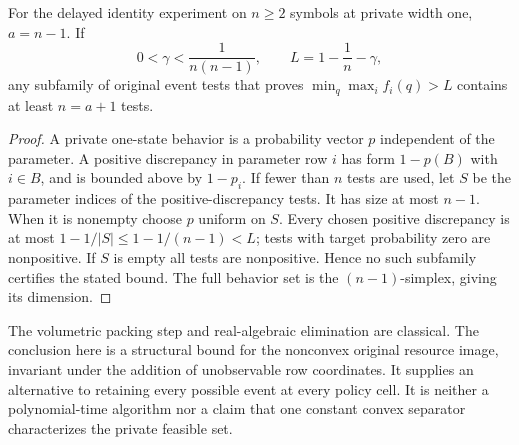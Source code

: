 \begin{proposition}
\label{prop:v15-witness-lower}
For the delayed identity experiment on $n\ge2$ symbols at private
width one, $a=n-1$. If
\[
 0<\gamma<\frac1{n(n-1)},\qquad L=1-\frac1n-\gamma,
\]
any subfamily of original event tests that proves
$\min_q\max_i f_i(q)>L$ contains at least $n=a+1$ tests.
\end{proposition}
\begin{proof}
A private one-state behavior is a probability vector $p$ independent
of the parameter. A positive discrepancy in parameter row $i$ has
form $1-p(B)$ with $i\in B$, and is bounded above by $1-p_i$.
If fewer than $n$ tests are used, let $S$ be the parameter indices of
the positive-discrepancy tests. It has size at most $n-1$. When it is
nonempty choose $p$ uniform on $S$. Every chosen positive discrepancy
is at most $1-1/|S|\le1-1/(n-1)<L$; tests with target probability zero
are nonpositive. If $S$ is empty all tests are nonpositive. Hence no
such subfamily certifies the stated bound. The full behavior set is
the $(n-1)$-simplex, giving its dimension.
\end{proof}

The volumetric packing step and real-algebraic elimination are classical.
The conclusion here is a structural bound for the nonconvex original
resource image, invariant under the addition of unobservable row
coordinates. It supplies an alternative to retaining every possible
event at every policy cell. It is neither a polynomial-time algorithm
nor a claim that one constant convex separator characterizes the
private feasible set.
